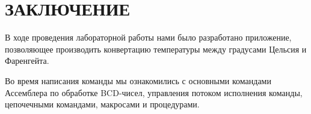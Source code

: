 \section*{ЗАКЛЮЧЕНИЕ}

В ходе проведения лабораторной работы нами было разработано приложение,
позволяющее производить конвертацию температуры между градусами Цельсия и
Фаренгейта.

Во время написания команды мы ознакомились с основными командами Ассемблера по 
обработке BCD-чисел, управления потоком исполнения команды, цепочечными командами,
макросами и процедурами.

\newpage


